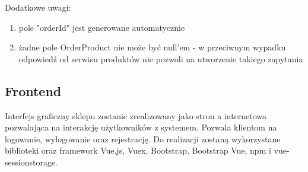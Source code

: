 \documentclass[11pt,a4paper,twoside]{article}
\begin{document}
Dodatkowe uwagi:
\begin{enumerate}
\item pole "orderId" jest generowane automatycznie
\item żadne pole OrderProduct nie może być null'em - w przeciwnym wypadku odpowiedź od serwisu produktów nie pozwoli na utworzenie takiego zapytania
\end{enumerate}




\newpage
\subsection{Frontend}
Interfejs graficzny sklepu zostanie zrealizowany jako stron a internetowa pozwalająca na interakcję użytkowników z systemem. Pozwala klientom na logowanie, wylogowanie oraz rejestrację. Do realizacji zostaną wykorzystane biblioteki oraz framework Vue.js, Vuex, Bootstrap, Bootstrap Vue, npm i vue-sessionstorage.
\end{document}
